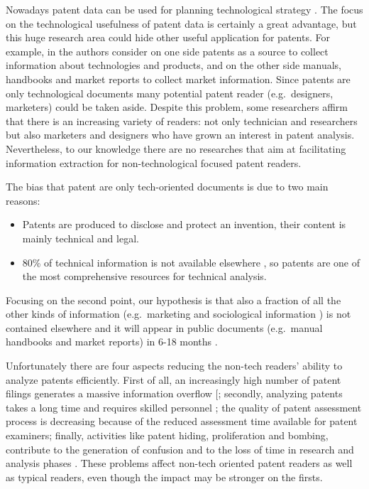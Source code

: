 \documentclass[]{book}
\providecommand{\tightlist}{%
  \setlength{\itemsep}{0pt}\setlength{\parskip}{0pt}}
\begin{document}
Nowadays patent data can be used for planning technological strategy
\citep{ernst2003patent}. The focus on the technological usefulness of
patent data is certainly a great advantage, but this huge research area
could hide other useful application for patents. For example, in
\citep{jin2015technology} the authors consider on one side patents as a
source to collect information about technologies and products, and on
the other side manuals, handbooks and market reports to collect market
information. Since patents are only technological documents many
potential patent reader (e.g.~designers, marketers) could be taken
aside. Despite this problem, some researchers \citep{bonino2010review}
affirm that there is an increasing variety of readers: not only
technician and researchers but also marketers and designers who have
grown an interest in patent analysis. Nevertheless, to our knowledge
there are no researches that aim at facilitating information extraction
for non-technological focused patent readers.

The bias that patent are only tech-oriented documents is due to two main
reasons:

\begin{itemize}
\tightlist
\item
  Patents are produced to disclose and protect an invention, their
  content is mainly technical and legal.
\item
  80\% of technical information is not available elsewhere
  \citep{terragno1979}, so patents are one of the most comprehensive
  resources for technical analysis.
\end{itemize}

Focusing on the second point, our hypothesis is that also a fraction of
all the other kinds of information (e.g.~marketing and sociological
information ) is not contained elsewhere and it will appear in public
documents (e.g.~manual handbooks and market reports) in 6-18 months
\citep{golzio2012}.

Unfortunately there are four aspects reducing the non-tech readers'
ability to analyze patents efficiently. First of all, an increasingly
high number of patent filings generates a massive information overflow
{[}\citet{bergmann2008evaluating}; secondly, analyzing patents takes a
long time and requires skilled personnel \citep{liang2007text}; the
quality of patent assessment process is decreasing
\citep[\citet{philipp2006}]{burke2007} because of the reduced assessment
time available for patent examiners; finally, activities like patent
hiding, proliferation and bombing, contribute to the generation of
confusion and to the loss of time in research and analysis phases
\citep{fantoni2013automatic}. These problems affect non-tech oriented
patent readers as well as typical readers, even though the impact may be
stronger on the firsts.
\end{document}
